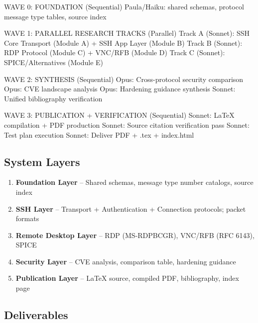 \documentclass[11pt,letterpaper]{article}
\begin{document}
\begin{asciibox}
WAVE 0: FOUNDATION (Sequential)
  Paula/Haiku: shared schemas, protocol message type tables, source index

WAVE 1: PARALLEL RESEARCH TRACKS (Parallel)
  Track A (Sonnet):   SSH Core Transport (Module A) + SSH App Layer (Module B)
  Track B (Sonnet):   RDP Protocol (Module C) + VNC/RFB (Module D)
  Track C (Sonnet):   SPICE/Alternatives (Module E)

WAVE 2: SYNTHESIS (Sequential)
  Opus: Cross-protocol security comparison
  Opus: CVE landscape analysis
  Opus: Hardening guidance synthesis
  Sonnet: Unified bibliography verification

WAVE 3: PUBLICATION + VERIFICATION (Sequential)
  Sonnet: LaTeX compilation + PDF production
  Sonnet: Source citation verification pass
  Sonnet: Test plan execution
  Sonnet: Deliver PDF + .tex + index.html
\end{asciibox}

\subsection{System Layers}

\begin{enumerate}
\item \textbf{Foundation Layer} -- Shared schemas, message type number catalogs, source index
\item \textbf{SSH Layer} -- Transport + Authentication + Connection protocols; packet formats
\item \textbf{Remote Desktop Layer} -- RDP (MS-RDPBCGR), VNC/RFB (RFC 6143), SPICE
\item \textbf{Security Layer} -- CVE analysis, comparison table, hardening guidance
\item \textbf{Publication Layer} -- LaTeX source, compiled PDF, bibliography, index page
\end{enumerate}

\subsection{Deliverables}
\end{document}
